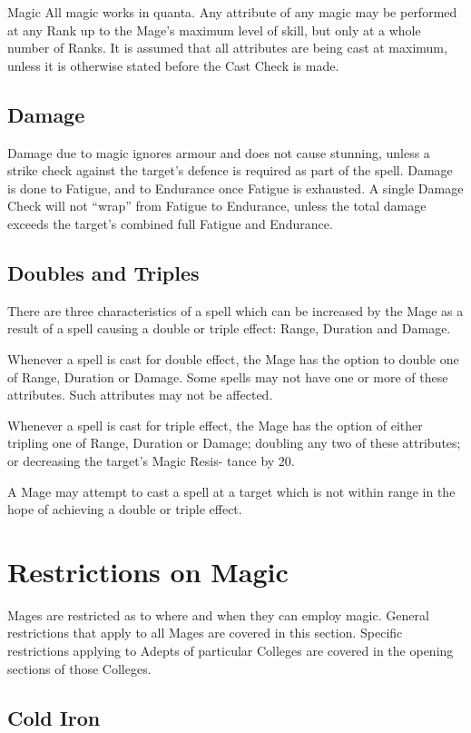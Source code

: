 \begin{Chapter}{Magic}
All magic works in quanta.  Any attribute of any magic may be
performed at any Rank up to the Mage’s maximum level of skill, but
only at a whole number of Ranks.  It is assumed that all attributes
are being cast at maximum, unless it is otherwise stated before the
Cast Check is made.

\subsection{Damage}

Damage due to magic ignores armour and does not cause stunning, unless
a strike check against the target’s defence is required as part of the
spell.  Damage is done to Fatigue, and to Endurance once Fatigue is
exhausted. A single Damage Check will not “wrap” from Fatigue to
Endurance, unless the total damage exceeds the target’s combined full
Fatigue and Endurance.

\subsection{Doubles and Triples}

There are three characteristics of a spell which can be increased by
the Mage as a result of a spell causing a double or triple effect:
Range, Duration and Damage.

Whenever a spell is cast for double effect, the Mage has the option to
double one of Range, Duration or Damage. Some spells may not have one
or more of these attributes. Such attributes may not be affected.

Whenever a spell is cast for triple effect, the Mage has the option of
either tripling one of Range, Duration or Damage; doubling any two of
these attributes; or decreasing the target’s Magic Resis- tance by 20.

A Mage may attempt to cast a spell at a target which is not within
range in the hope of achieving a double or triple effect.


\section{Restrictions on Magic}

Mages are restricted as to where and when they can employ
magic. General restrictions that apply to all Mages are covered in
this section. Specific restrictions applying to Adepts of particular
Colleges are covered in the opening sections of those Colleges.

\subsection{Cold Iron}


\end{Chapter}
